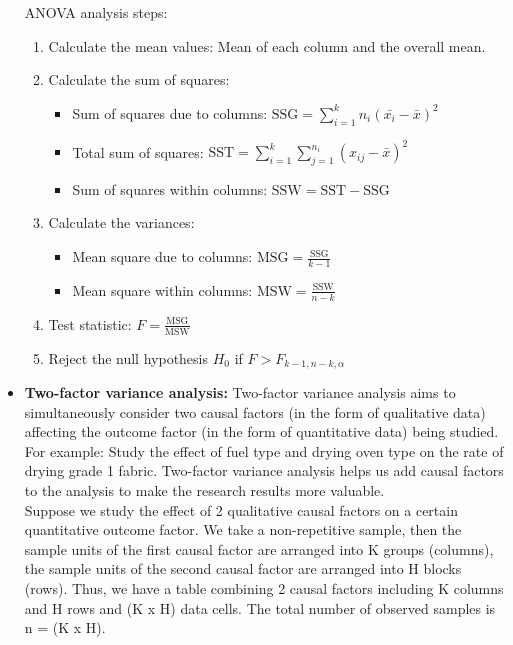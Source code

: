 \documentclass{article}
\begin{document}
\begin{itemize}
\begin{itemize}
		\end{itemize}
		ANOVA analysis steps:
		\begin{enumerate}
			\item Calculate the mean values: Mean of each column and the overall mean.
			\item Calculate the sum of squares:
			\begin{itemize}
				\item Sum of squares due to columns: \( \text{SSG} = \sum_{i=1}^k n_i (\bar{x_i} - \bar{x})^2 \)
				\item Total sum of squares: \( \text{SST} = \sum_{i=1}^k \sum_{j=1}^{n_i} (x_{ij} - \bar{x})^2 \)
				\item Sum of squares within columns: \( \text{SSW} = \text{SST} - \text{SSG} \)
			\end{itemize}
			\item Calculate the variances:
			\begin{itemize}
				\item Mean square due to columns: \( \text{MSG} = \frac{\text{SSG}}{k-1} \)
				\item Mean square within columns: \( \text{MSW} = \frac{\text{SSW}}{n-k} \)
			\end{itemize}
			\item Test statistic: \( F = \frac{\text{MSG}}{\text{MSW}} \)
			\item Reject the null hypothesis \( H_0 \) if \( F > F_{k-1, n-k, \alpha} \)
		\end{enumerate}
		\item 
		\textbf{Two-factor variance analysis:} Two-factor variance analysis aims to simultaneously consider two causal factors (in the form of qualitative data) affecting the outcome factor (in the form of quantitative data) being studied. For example: Study the effect of fuel type and drying oven type on the rate of drying grade 1 fabric. Two-factor variance analysis helps us add causal factors to the analysis to make the research results more valuable.\\
		Suppose we study the effect of 2 qualitative causal factors on a certain quantitative outcome factor. We take a non-repetitive sample, then the sample units of the first causal factor are arranged into K groups (columns), the sample units of the second causal factor are arranged into H blocks (rows). Thus, we have a table combining 2 causal factors including K columns and H rows and (K x H) data cells. The total number of observed samples is n = (K x H).\\

\end{itemize}
\end{document}
